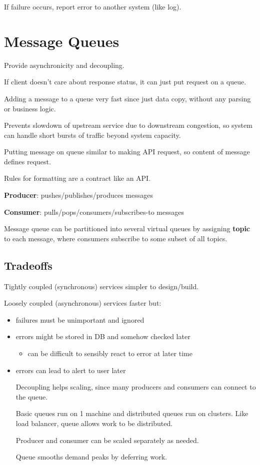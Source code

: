 \documentclass[11pt]{article}
\begin{document}
If failure occurs, report error to another system (like log).
\section{Message Queues}
\label{sec:org5aebe92}
Provide asynchronicity and decoupling.

If client doesn't care about response status, it can just put request on a queue.

Adding a message to a queue very fast since just data copy, without any parsing or
business logic.

Prevents slowdown of upstream service due to downstream congestion, so system can
handle short bursts of traffic beyond system capacity.

Putting message on queue similar to making API request, so content of message
defines request.

Rules for formatting are a contract like an API.

\textbf{Producer}: pushes/publishes/produces messages

\textbf{Consumer}: pulls/pops/consumers/subscribes-to messages

Message queue can be partitioned into several virtual queues by assigning
\textbf{topic} to each message, where consumers subscribe to some subset of all
topics.
\subsection{Tradeoffs}
\label{sec:orga07cd0c}
Tightly coupled (synchronous) services simpler to design/build.

Loosely coupled (asynchronous) services faster but:
\begin{itemize}
\item failures must be unimportant and ignored
\item errors might be stored in DB and somehow checked later
\begin{itemize}
\item can be difficult to sensibly react to error at later time
\end{itemize}
\item errors can lead to alert to user later

Decoupling helps scaling, since many producers and consumers can
connect to the queue.

Basic queues run on 1 machine and distributed queues run on clusters.
Like load balancer, queue allows work to be distributed.

Producer and consumer can be scaled separately as needed.

Queue smooths demand peaks by deferring work.
\end{itemize}
\end{document}
